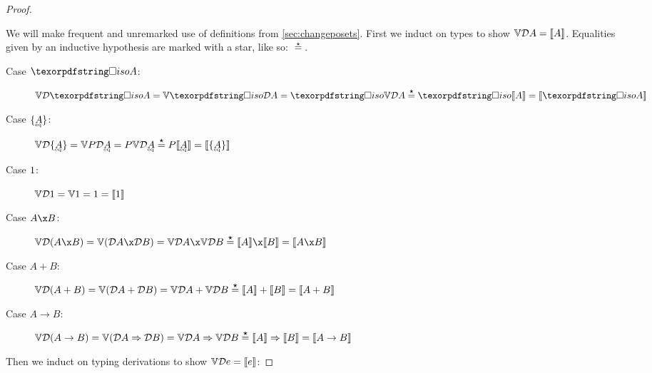 \documentclass{rntz}\usepackage{fantasy}%
\begin{document}

\thmForget*
\begin{proof}\label{proof:forget}

  We will make frequent and unremarked use of definitions from
  \cref{sec:changeposets}. First we induct on types to show $\mathbb{V}{\mathcal{D} A} =
  \llbracket{A}\rrbracket$. Equalities given by an inductive hypothesis are marked with a star,
  like so: $\stareq$.

  \begin{description}
    \item[Case $\isof A$:] \(\vals{\incdens{\isof A}}
      = \vals{\discof{\incdens A}}
      = \isof{\vals{\incdens A}} \stareq \isof{\den A}
      = \den{\isof A} \)


    \item[Case $\tset{\eqt A}$:]
      \(\vals{\incdens{\tset{\eqt A}}}
      = \vals{\pfinof{\incdens{\eqt A}}}
      = \pfinof{\vals{\incdens{\eqt A}}}
      \stareq \pfinof{\den{\eqt A}}
      = \den{\tset{\eqt A}} \)

    \item[Case $1$:] \(\mathbb{V}{\mathcal{D} 1} = \mathbb{V}1 = 1 = \llbracket{1}\rrbracket\)

    \item[Case $A \x B$:] \(\vals{\incden{A \x B}}
      = \vals{(\incdens A \x \incdens B)}
      = \vals{\incdens A} \x \vals{\incdens B}
      \stareq \den{A} \x \den{B}
      = \den{A \x B} \)

    \item[Case $A + B$:] \(\mathbb{V}{\mathcal{D}({A + B})}
      = \mathbb{V}{(\mathcal{D} A + \mathcal{D} B)}
      = \mathbb{V}{\mathcal{D} A} + \mathbb{V}{\mathcal{D} B}
      \overset{\boldsymbol\star}{=} \llbracket{A}\rrbracket + \llbracket{B}\rrbracket
      = \llbracket{A + B}\rrbracket
      \)

    \item[Case $A \to B$:] \(\mathbb{V}{\mathcal{D}({A \to B})}
      = \mathbb{V}{(\mathcal{D} A \Rightarrow \mathcal{D} B)}
      = \mathbb{V}\mathcal{D} A \Rightarrow \mathbb{V}\mathcal{D} B
      \overset{\boldsymbol\star}{=} \llbracket{A}\rrbracket \Rightarrow \llbracket{B}\rrbracket
      = \llbracket{A \to B}\rrbracket
      \)
  \end{description}

  \noindent
  Then we induct on typing derivations to show $\mathbb{V} \mathcal{D} e = \llbracket{e}\rrbracket$:


\end{proof}
\end{document}
